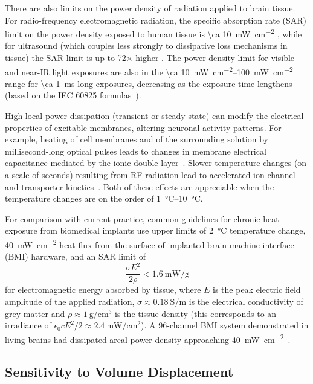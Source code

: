 There are also limits on the power density of radiation applied to brain tissue.
For radio-frequency electromagnetic radiation, the specific absorption rate (SAR) limit on the power density exposed to human tissue is \SI{\ca 10}{\milli\watt\per\centi\meter\squared} \cite{IEEE_RF_standard}, while for ultrasound (which couples less strongly to dissipative loss mechanisms in tissue) the SAR limit is up to 72$\times$ higher \cite{FDA_ultrasound_standard}.
The power density limit for visible and near-IR light exposures are also in the \SIrange{\ca 10}{100}{\milli\watt\per\centi\meter\squared} range for \SI{\ca 1}{\milli\second} long exposures, decreasing as the exposure time lengthens (based on the IEC 60825 formulas~\cite{iec60825}).

High local power dissipation (transient or steady-state) can modify the electrical properties of excitable membranes, altering neuronal activity patterns.
For example, heating of cell membranes and of the surrounding solution by millisecond-long optical pulses leads to changes in membrane electrical capacitance mediated by the ionic double layer~\cite{shapiro12}.
Slower temperature changes (on a scale of seconds) resulting from RF radiation lead to accelerated ion channel and transporter kinetics~\cite{shapiro13}.
Both of these effects are appreciable when the temperature changes are on the order of \SIrange{1}{10}{\degreeCelsius}.

For comparison with current practice, common guidelines for chronic heat exposure from biomedical implants \cite{Wolf2008} use upper limits of \SI{2}{\celsius} temperature change, \SI{40}{\milli\watt\per\centi\meter\squared} heat flux from the surface of implanted brain machine interface (BMI) hardware, and an SAR limit of \[\frac{\sigma E^2}{2 \rho} < \SI{1.6}{\milli\watt\per\gram}\] for electromagnetic energy absorbed by tissue, where $E$ is the peak electric field amplitude of the applied radiation, $\sigma \approx \SI{0.18}{\siemens\per\meter}$ is the electrical conductivity of grey matter and $\rho \approx \SI{1}{\gram\per\centi\meter\cubed}$ is the tissue density \cite{Lazzi2005} (this corresponds to an irradiance of $\epsilon_0 c E^2 / 2 \approx \SI{2.4}{\milli\watt\per\centi\meter\squared}$). A 96-channel BMI system demonstrated in living brains had dissipated areal power density approaching \SI{40}{\milli\watt\per\centi\meter\squared}~\cite{rizk2009}.

\subsection{Sensitivity to Volume Displacement}

